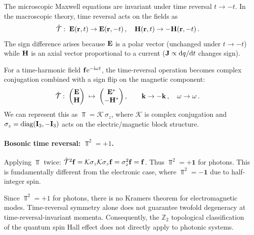 The microscopic Maxwell equations are invariant under time reversal
$t\to -t$.  In the macroscopic theory, time reversal acts on the fields
as
\begin{equation}\label{eq:ch2-TR-fields}
  \hat{\mathcal{T}}:\;
  \mathbf{E}(\mathbf{r},t)\to\mathbf{E}(\mathbf{r},-t)\,,\quad
  \mathbf{H}(\mathbf{r},t)\to-\mathbf{H}(\mathbf{r},-t)\,.
\end{equation}
The sign difference arises because $\mathbf{E}$ is a polar vector
(unchanged under $t\to -t$) while $\mathbf{H}$ is an axial vector
proportional to a current ($\mathbf{J}\propto\mathrm{d} q/\mathrm{d} t$ changes sign).

For a time-harmonic field $\mathbf{f}\mathrm{e}^{-\mathrm{i}\omega t}$, the
time-reversal operation becomes complex conjugation combined with a sign
flip on the magnetic component:
\begin{equation}\label{eq:ch2-TR-harmonic}
  \hat{\mathcal{T}}:\;
  \begin{pmatrix}\mathbf{E}\\\mathbf{H}\end{pmatrix}
  \;\mapsto\;
  \begin{pmatrix}\mathbf{E}^*\\-\mathbf{H}^*\end{pmatrix},
  \qquad
  \mathbf{k}\to-\mathbf{k}\,,\quad \omega\to\omega\,.
\end{equation}
We can represent this as $\Top=\mathcal{K}\,\sigma_z$, where
$\mathcal{K}$ is complex conjugation and
$\sigma_z=\operatorname{diag}(\mathbf{I}_3,-\mathbf{I}_3)$ acts on the
electric/magnetic block structure.

\paragraph{Bosonic time reversal: $\Top^2=+1$.}
Applying $\Top$ twice:
$\hat{\mathcal{T}}^2\mathbf{f} = \mathcal{K}\sigma_z\mathcal{K}\sigma_z\mathbf{f}
= \sigma_z^2\mathbf{f} = \mathbf{f}$.
Thus $\Top^2=+\mathbf{1}$ for photons.  This is fundamentally different
from the electronic case, where $\Top^2=-\mathbf{1}$ due to half-integer
spin.

\begin{proposition}
  \label{prop:ch2-no-kramers}
  Since $\Top^2=+1$ for photons, there is no Kramers theorem for
  electromagnetic modes.  Time-reversal symmetry alone does not
  guarantee twofold degeneracy at time-reversal-invariant momenta.
  Consequently, the $\mathbb{Z}_2$ topological classification of the
  quantum spin Hall effect does not directly apply to photonic systems.
\end{proposition}

